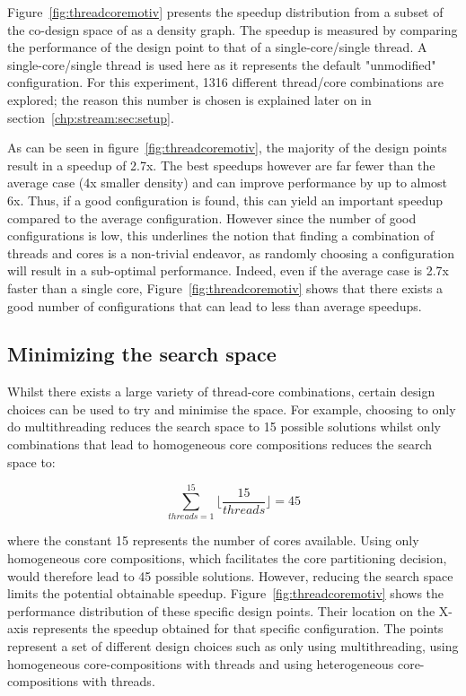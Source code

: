 Figure~\ref{fig:threadcoremotiv} presents the speedup distribution from a subset of the co-design space of  as a density graph.
The speedup is measured by comparing the performance of the design point to that of a single-core/single thread.
A single-core/single thread is used here as it represents the default "unmodified" configuration.
For this experiment, 1316 different thread/core combinations are explored; the reason this number is chosen is explained later on in section~\ref{chp:stream:sec:setup}.

As can be seen in figure~\ref{fig:threadcoremotiv}, the majority of the design points result in a speedup of 2.7x.
The best speedups however are far fewer than the average case (4x smaller density) and can improve performance by up to almost 6x.
Thus, if a good configuration is found, this can yield an important speedup compared to the average configuration.
However since the number of good configurations is low, this underlines the notion that finding a combination of threads and cores is a non-trivial endeavor, as randomly choosing a configuration will result in a sub-optimal performance.
Indeed, even if the average case is 2.7x faster than a single core, Figure~\ref{fig:threadcoremotiv} shows that there exists a good number of configurations that can lead to less than average speedups.

\subsection{Minimizing the search space}
Whilst there exists a large variety of thread-core combinations, certain design choices can be used to try and minimise the space.
For example, choosing to only do multithreading reduces the search space to 15 possible solutions whilst only combinations that lead to homogeneous core compositions reduces the search space to:

\begin{equation}
\sum_{threads=1}^{15} \lfloor\frac{15}{threads}\rfloor= 45
\end{equation}

where the constant 15 represents the number of cores available.
Using only homogeneous core compositions, which facilitates the core partitioning decision, would therefore lead to 45 possible solutions.
However, reducing the search space limits the potential obtainable speedup.
Figure~\ref{fig:threadcoremotiv} shows the performance distribution of these specific design points.
Their location on the X-axis represents the speedup obtained for that specific configuration.
The points represent a set of different design choices such as only using multithreading, using homogeneous core-compositions with threads and using heterogeneous core-compositions with threads.

